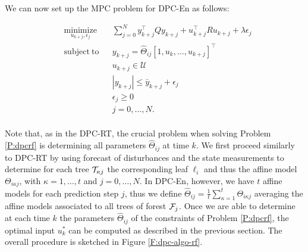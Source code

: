 


\textcolor[rgb]{0,0,1}{We can now set up the MPC problem for DPC-En as follows:}
\begin{problem}\label{P:dpcrf}
	\begin{equation}
		\begin{aligned}
		& \underset{u_{k+j},\epsilon_j}{\mathrm{minimize}} & & \sum_{j=0}^{N} y^\top_{k+j} Q y_{k+j} + u^\top_{k+j} R u_{k+j} + \lambda\epsilon_j \\
		& \mathrm{subject\ to }                 & & y_{k+j}      =  \hat{\Theta}_{ij} [1,u_{k},\ldots,u_{k+j} ]^\top                      \\
		&                                       & & u_{k+j}    \in  \mathcal{U}                                                        \\
		&                                       & & |y_{k+j}|  \leq \bar{y}_{k+j} + \epsilon_j 										 \\
		&                                       & & \epsilon_j \geq  0							                                     \\
		&                                       & & j           =    0,\ldots,N.            									         \\
		\end{aligned}
		\label{E:dpcrf}
	\end{equation}
\end{problem}
\textcolor[rgb]{0,0,1}{Note that, as in the DPC-RT, the crucial problem when solving Problem \ref{P:dpcrf} is determining all parameters $\hat{\Theta}_{ij}$ at time $k$. We first proceed similarly to DPC-RT by using forecast of disturbances and the state measurements to determine for each tree $\mathcal{T}_{\kappa j}$ the corresponding leaf $\ell_i$ and thus the affine model $\Theta_{i \kappa j}$, with $\kappa = 1,\ldots,t$ and $j = 0,\ldots,N$. In DPC-En, however, we have $t$ affine models for each prediction step $j$, thus we define $\hat{\Theta}_{ij} = \frac{1}{t}\sum\limits_{\kappa = 1}^{t} \Theta_{i \kappa j}$ averaging the affine models associated to all trees of forest $\mathcal{F}_j$. Once we are able to determine at each time $k$ the parameters $\hat{\Theta}_{ij}$ of the constraints of Problem \ref{P:dpcrf}, the optimal input $u^*_k$ can be computed as described in the previous section. The overall procedure is sketched in Figure \ref{F:dpc-algo-rf}.}

